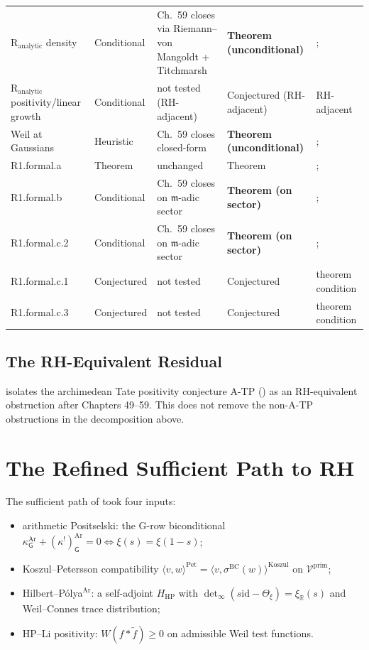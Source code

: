\begin{longtable}{p{}|p{}|p{}|p{}|p{}}
\(\mathrm{R}_{\mathrm{analytic}}\) density & Conditional &
Ch.~59 closes via Riemann--von Mangoldt + Titchmarsh &
\textbf{Theorem (unconditional)} &; \\
\(\mathrm{R}_{\mathrm{analytic}}\) positivity/linear growth &
Conditional & not tested (RH-adjacent) & Conjectured
(RH-adjacent) & RH-adjacent \\
Weil at Gaussians & Heuristic & Ch.~59 closes closed-form &
\textbf{Theorem (unconditional)} &; \\
R1.formal.a & Theorem & unchanged & Theorem &; \\
R1.formal.b & Conditional & Ch.~59 closes on
\(\mathfrak{m}\)-adic sector & \textbf{Theorem (on sector)} &; \\
R1.formal.c.2 & Conditional & Ch.~59 closes on
\(\mathfrak{m}\)-adic sector & \textbf{Theorem (on sector)} &; \\
R1.formal.c.1 & Conjectured & not tested & Conjectured & theorem condition \\
R1.formal.c.3 & Conjectured & not tested & Conjectured & theorem condition \\
\end{longtable}
\endgroup

\subsection{The RH-Equivalent Residual}
\label{v4-arith:w5-synth:crown-jewel}

 isolates the archimedean Tate
positivity conjecture A-TP
() as an
RH-equivalent obstruction after Chapters 49--59. This does not remove
the non-A-TP obstructions in the decomposition above.

\section{The Refined Sufficient Path to RH}
\label{v4-arith:w5-synth:refined-sufficient-path}

The sufficient path of  took four
inputs:
\begin{itemize}
\item[(P1)] arithmetic Positselski: the G-row biconditional
\(\kappa^{\mathrm{Ar}}_{\mathsf{G}}+(\kappa^{!})^{\mathrm{Ar}}_{\mathsf{G}}=0
\Leftrightarrow \xi(s)=\xi(1-s)\);
\item[(KP)] Koszul--Petersson compatibility
\(\langle v,w\rangle^{\mathrm{Pet}}=\langle v,\sigma^{\mathrm{BC}}(w)\rangle^{\mathrm{Koszul}}\)
on \(\mathcal{V}^{\mathrm{prim}}\);
\item[(HP)] Hilbert--P\'olya\(^{\mathrm{Ar}}\): a self-adjoint
\(H_{\mathrm{HP}}\) with
\(\det_{\infty}(s\mathrm{id}-\Theta_{\xi})=\xi_{\mathbb{R}}(s)\)
and Weil--Connes trace distribution;
\item[(HPLi)] HP--Li positivity:
\(W(f*\widetilde{f})\geq 0\) on admissible Weil test functions.
\end{itemize}

